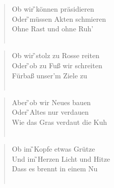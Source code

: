 \documentclass[9pt,a4paper,oneside, onecolumn]{article}
\begin{document}
\begin{multicols}{2}

\begin{verse}
Ob wir \G{}können präsidieren\\
Oder \G{}müssen Akten schmieren\\
Ohne \Am{}Rast und ohne Ruh'\\
\\

\end{verse}

\begin{verse}
Ob wir \G{}stolz zu Rosse reiten\\
Oder \G{}ob zu Fuß wir schreiten\\
Für\Am{}baß unser'm Ziele zu\\
\\

\end{verse}

\begin{verse}
Aber \G{}ob wir Neues bauen\\
Oder \G{}Altes nur verdauen\\
Wie das \Am{}Gras verdaut die Kuh\\
\\
\end{verse}

\begin{verse}
Ob im \G{}Kopfe etwas Grütze\\
Und im \G{}Herzen Licht und Hitze\\
Dass es \Am{}brennt in einem Nu\\
\\
\end{verse}


\end{multicols}
\end{document}

